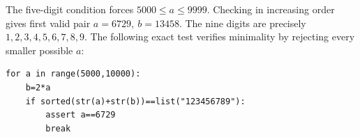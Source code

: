 The five-digit condition forces $5000\le a\le9999$. Checking in increasing order gives first valid pair $\boxed{a=6729,\ b=13458}$. The nine digits are precisely $1,2,3,4,5,6,7,8,9$. The following exact test verifies minimality by rejecting every smaller possible $a$:\begin{verbatim}
for a in range(5000,10000):
    b=2*a
    if sorted(str(a)+str(b))==list("123456789"):
        assert a==6729
        break
\end{verbatim}
